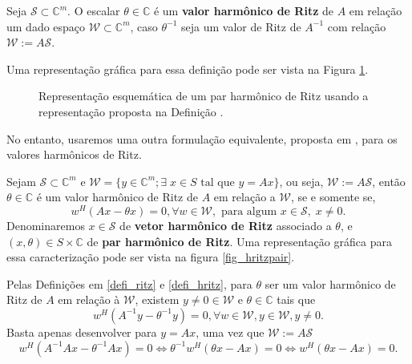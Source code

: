 \begin{defi}\label{defi_hritz}
 Seja $\mathcal{S}\subset \mathbb{C}^m$. O escalar $\theta\in\mathbb{C}$ é um \textbf{valor harmônico de Ritz} de $A$ em relação um dado espaço $\mathcal{W}\subset \mathbb{C}^m$, caso $\theta^{-1}$ seja um valor de Ritz de $A^{-1}$  com relação $\mathcal{W}:=A\mathcal{S}$.
\end{defi}
Uma representação gráfica para essa definição pode ser vista na Figura \ref{fig_hritzpairorig}.
\begin{figure}[htb]
  \caption{Representação esquemática de um par harmônico de Ritz usando a representação proposta na Definição \protect{\ref{defi_hritz}}.}\label{fig_hritzpairorig}
\end{figure}
No entanto, usaremos uma outra formulação equivalente, proposta em \cite{SleijpenVorst00JacobiDavidson}, para os valores harmônicos de Ritz.
\begin{teore}\label{teo_SleijpenVorst00JacobiDavidson}
Sejam $\mathcal{S}\subset \mathbb{C}^m$ e $\mathcal{W}=\{y\in\mathbb{C}^{m};\exists\; x\in S\text{ tal que } y=Ax\}$, ou seja, $\mathcal{W}:=A\mathcal{S}$, então  $\theta\in\mathbb{C}$ é um valor harmônico de Ritz de $A$ em relação a $\mathcal{W}$,  se e somente se,
\begin{equation}\label{eq_hritz}
 w^H(Ax - \theta x) = 0, \forall w \in \mathcal{W},\text{ para algum  }   x\in \mathcal{S},\;x\neq 0.
\end{equation}
Denominaremos $x\in \mathcal{S}$ de \textbf{vetor harmônico de Ritz} associado a $\theta$, e $(x,\theta)\in S\times \mathbb{C}$ de \textbf{par harmônico de Ritz}.  Uma representação gráfica para essa caracterização pode ser vista na figura \ref{fig_hritzpair}.
\end{teore}
\dem
Pelas Definiç\~{o}es em \ref{defi_ritz} e \ref{defi_hritz}, para $\theta$ ser um valor harmônico de Ritz de $A$ em relação à $\mathcal{W}$, existem $y\ne0 \in \mathcal{W}$ e $\theta\in \mathbb{C}$ tais que
\[
 w^H(A^{-1}y - \theta^{-1} y) = 0, \forall w \in \mathcal{W}, y\in\mathcal{W}, y\ne 0.
\]
Basta apenas desenvolver para $y=Ax$, uma vez que  $\mathcal{W}:=A\mathcal{S}$
\[
 w^H(A^{-1}Ax - \theta^{-1} Ax) = 0\Leftrightarrow \theta^{-1}w^H(\theta x - Ax) = 0\Leftrightarrow w^H(\theta x - Ax) = 0.
\]
\fim

